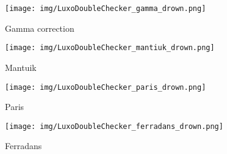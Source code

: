 \documentclass[journal]{IEEEtran}
\begin{document}
\begin{figure*}[tb]
        \centering
        \begin{subfigure}[b]{0.245\textwidth}
            \centering
            \texttt{[image: img/LuxoDoubleChecker\_gamma\_drown.png]}
            \caption[]%
            {{\small Gamma correction }}    
            \label{fig:mean and std of net14}
        \end{subfigure}
        \begin{subfigure}[b]{0.245\textwidth}  
            \centering 
            \texttt{[image: img/LuxoDoubleChecker\_mantiuk\_drown.png]}
            \caption[]%
            {{\small Mantuik \cite{mantiuk2008display} }}    
            \label{fig:mean and std of net24}
        \end{subfigure}
        \begin{subfigure}[b]{0.245\textwidth}   
            \centering 
            \texttt{[image: img/LuxoDoubleChecker\_paris\_drown.png]}
            \caption[]%
            {{\small Paris\cite{paris2015local} }}    
            \label{fig:mean and std of net34}
        \end{subfigure}
        \begin{subfigure}[b]{0.245\textwidth}   
            \centering 
            \texttt{[image: img/LuxoDoubleChecker\_ferradans\_drown.png]}
            \caption[]%
            {{\small Ferradans \cite{ferradans2011analysis} }}    
            \label{fig:mean and std of net44}
        \end{subfigure}
      

\end{figure*}
\end{document}
